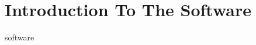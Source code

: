 \hypertarget{group__intro_software}{\section{Introduction To The Software}
\label{group__intro_software}
}
software\par
 